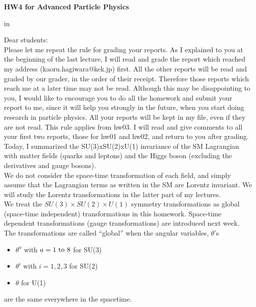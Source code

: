 \documentclass[12pt]{article}
\begin{document}
\begin{center}
{\large\bf HW4 for Advanced Particle Physics} \\

\end{center}

 in

Dear students:\\

  Please let me repeat the rule for grading your reports.
  As I explained to you at the beginning of the last lecture,
  I will read and grade the report which reached my address
  (kaoru.hagiwara@kek.jp) first.  All the other reports will
  be read and graded by our grader, in the order of their
  receipt.  Therefore those reports which reach me at a
  later time may not be read.  Although this may be disappointing
  to you, I would like to encourage you to do all the homework
  and submit your report to me, since it will help you strongly
  in the future, when you start doing research in particle physics.
  All your reports will be kept in my file, even if they are not
  read.  This rule applies from hw03.  I will read and give comments
  to all your first two reports, those for hw01 and hw02, and
  return to you after grading.\\


  Today, I summarized the SU(3)xSU(2)xU(1) invariance of
  the SM Lagrangian with matter fields (quarks and leptons)
  and the Higgs boson (excluding the derivatives and gauge bosons).\\

  We do not consider the space-time transformation of each
  field, and simply assume that the Lagrangian terms as
  written in the SM are Lorentz invariant.  We will study
  the Lorentz transformations in the latter part of my
  lectures.\\

  We treat the $SU(3)\times SU(2)\times U(1)$ symmetry transformations
  as global (space-time independent) transformations in
  this homework. Space-time dependent transformations
  (gauge transformations) are introduced next week.\\

  The transformations are called ``global'' when the angular
  variables, $\theta$'s
\begin{itemize}
    \item $\theta^a$ with $a=1~{\rm to}~8$ for SU(3)
    \item $\theta^i$ with $i=1,2,3$  for SU(2)
    \item $\theta$                for U(1)
\end{itemize}
  are the same everywhere in the spacetime.
\end{document}
